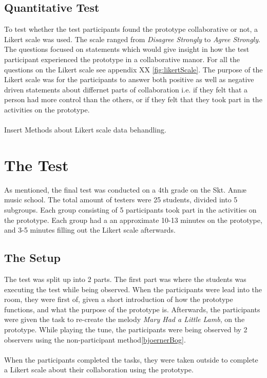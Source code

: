 \subsection{Quantitative Test}
To test whether the test participants found the prototype collaborative or not, a Likert scale was used. The scale ranged from \textit{Disagree Strongly} to \textit{Agree Strongly}. The questions focused on statements which would give insight in how the test participant experienced the prototype in a collaborative manor. For all the questions on the Likert scale see appendix XX \ref{fig:likertScale}. The purpose of the Likert scale was for the participants to answer both positive as well as negative driven statements about differnet parts of collaboration i.e. if they felt that a person had more control than the others, or if they felt that they took part in the activities on the prototype.
\\\\
Insert Methods about Likert scale data behandling.

\section{The Test}
As mentioned, the final test was conducted on a 4th grade on the Skt. Annæ music school. The total amount of testers were 25 students,  divided into 5 subgroups. Each group consisting of 5 participants took part in the activities on the prototype. Each group had a an approximate 10-13 minutes on the prototype, and 3-5 minutes filling out the Likert scale afterwards.

\subsection{The Setup}
The test was split up into 2 parts. The first part was where the students was executing the test while being observed. When the participants were lead into the room, they were first of, given a short introduction of how the prototype functions, and what the purpose of the prototype is. Afterwards, the participants were given the task to re-create the melody \textit{Mary Had a Little Lamb}, on the prototype. While playing the tune, the participants were being observed by 2 observers using the non-participant method\ref{bjoernerBog}. 
\\\\
When the participants completed the tasks, they were taken outside to complete a Likert scale about their collaboration using the prototype. 

